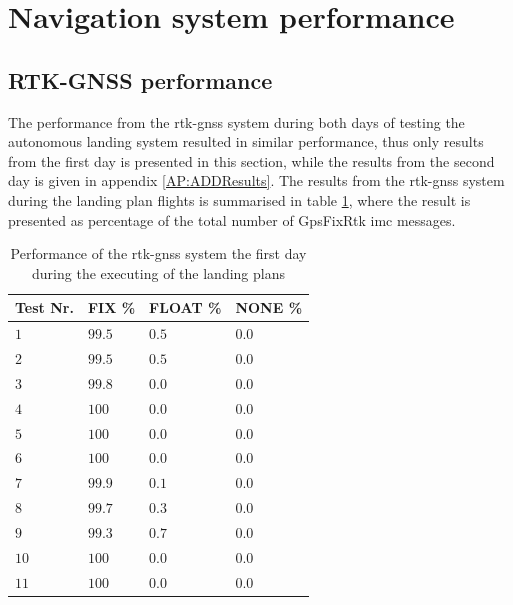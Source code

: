 \section{Navigation system performance}\label{ss:NavigationResults}
\subsection{RTK-GNSS performance}
The performance from the \gls{rtk-gnss} system during both days of testing the autonomous landing system resulted in similar performance, thus only results from the first day is presented in this section, while the results from the second day is given in appendix \ref{AP:ADDResults}. The results from the \gls{rtk-gnss} system during the landing plan flights is summarised in table \ref{TB:RTKFirstDayRTK}, where the result is presented as percentage of the total number of GpsFixRtk \gls{imc} messages.
\begin{table}[H]
\centering
\begin{tabular}{| l | l | l | l |}
\hline
\textbf{Test Nr.}	& \textbf{FIX \%}	& \textbf{FLOAT \%}	& \textbf{NONE \%}	\\ \hline
$1$				& $99.5 $	& $0.5$	& $0.0$									\\ \hline
$2$				& $99.5 $	& $0.5$	& $0.0$									\\ \hline
$3$				& $99.8 $	& $0.0$	& $0.0$									\\ \hline
$4$				& $100$		& $0.0$	& $0.0$									\\ \hline
$5$				& $100$		& $0.0$	& $0.0$									\\ \hline
$6$				& $100$		& $0.0$	& $0.0$									\\ \hline
$7$				& $99.9$	& $0.1$	& $0.0$									\\ \hline
$8$				& $99.7 $ 	& $0.3$	& $0.0$									\\ \hline
$9$				& $99.3$	& $0.7$	& $0.0$									\\ \hline
$10$			& $100$		& $0.0$	& $0.0$									\\ \hline
$11$			& $100$		& $0.0$	& $0.0$									\\ \hline
\end{tabular}
\caption{Performance of the \gls{rtk-gnss} system the first day during the executing of the landing plans}
\label{TB:RTKFirstDayRTK}
\end{table}
